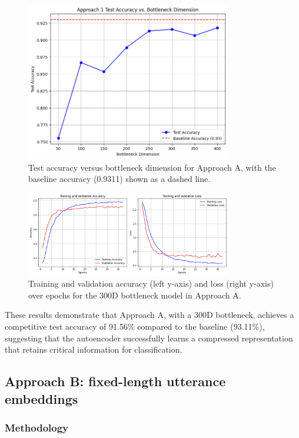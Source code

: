 \documentclass[12pt]{article}
\begin{document}
\begin{figure}[h]
    \centering
    \includegraphics[width=0.8\textwidth]{choose_vec.png}
    \caption{Test accuracy versus bottleneck dimension for Approach A, with the baseline accuracy (0.9311) shown as a dashed line.}
    \label{fig:test_acc_bottleneck}
\end{figure}

\begin{figure}[h]
    \centering
    \includegraphics[width=0.8\textwidth]{train_a.png}
    \caption{Training and validation accuracy (left y-axis) and loss (right y-axis) over epochs for the 300D bottleneck model in Approach A.}
    \label{fig:train_progress_300d}
\end{figure}

These results demonstrate that Approach A, with a 300D bottleneck, achieves a competitive test accuracy of 91.56\% compared to the baseline (93.11\%), suggesting that the autoencoder successfully learns a compressed representation that retains critical information for classification.

\subsection{Approach B: fixed-length utterance embeddings}
\subsubsection{Methodology}
\end{document}
